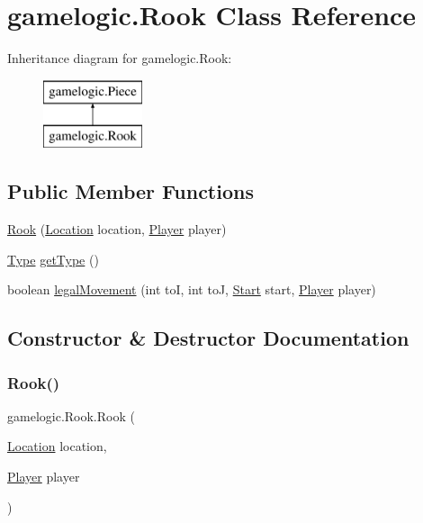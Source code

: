 \hypertarget{classgamelogic_1_1_rook}{}\section{gamelogic.\+Rook Class Reference}
\label{classgamelogic_1_1_rook}
Inheritance diagram for gamelogic.\+Rook\+:\begin{figure}[H]
\begin{center}
\leavevmode
\includegraphics[height=2.000000cm]{classgamelogic_1_1_rook}
\end{center}
\end{figure}
\subsection*{Public Member Functions}
\begin{DoxyCompactItemize}
\item 
\mbox{\hyperlink{classgamelogic_1_1_rook_aa326432823f48a6a727ec4df70d28849}{Rook}} (\mbox{\hyperlink{classgamelogic_1_1_location}{Location}} location, \mbox{\hyperlink{classgamelogic_1_1_player}{Player}} player)
\item 
\mbox{\hyperlink{enumgamelogic_1_1_type}{Type}} \mbox{\hyperlink{classgamelogic_1_1_rook_a65532b2680c7e661be8aff40304fbeef}{get\+Type}} ()
\item 
boolean \mbox{\hyperlink{classgamelogic_1_1_rook_a655f65fd697faa14fb21952167157621}{legal\+Movement}} (int toI, int toJ, \mbox{\hyperlink{classgamelogic_1_1_start}{Start}} start, \mbox{\hyperlink{classgamelogic_1_1_player}{Player}} player)
\end{DoxyCompactItemize}


\subsection{Constructor \& Destructor Documentation}
\mbox{\label{classgamelogic_1_1_rook_aa326432823f48a6a727ec4df70d28849}} 
\subsubsection{\texorpdfstring{Rook()}{Rook()}}
{\footnotesize\ttfamily gamelogic.\+Rook.\+Rook (\begin{DoxyParamCaption}\item[{\mbox{\hyperlink{classgamelogic_1_1_location}{Location}}}]{location,  }\item[{\mbox{\hyperlink{classgamelogic_1_1_player}{Player}}}]{player }\end{DoxyParamCaption})}


